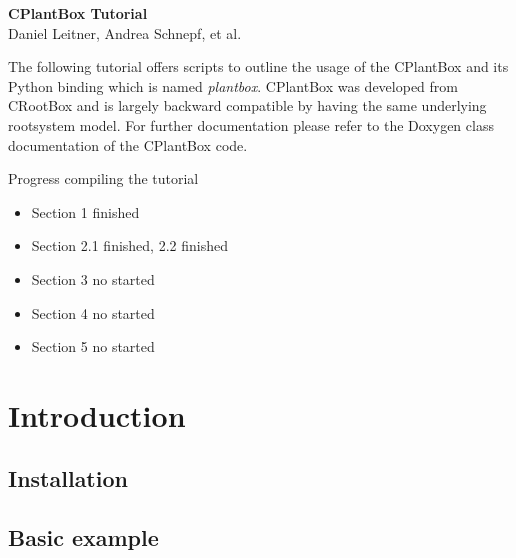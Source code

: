 \documentclass[a4paper]{article}
\begin{document}
\begin{center}
\vspace{0.5 cm}
\huge{\textbf{CPlantBox Tutorial}} \\
\vspace{0.5 cm}
\normalsize
Daniel Leitner, Andrea Schnepf, et al. \\
\end{center}

\vspace{0.5 cm}

\noindent 
The following tutorial offers scripts to outline the usage of the CPlantBox \citep{zhou2020cplantbox} and its Python binding which is named \emph{plantbox}. CPlantBox was developed from CRootBox \citep{schnepf2018crootbox} and is largely backward compatible by having the same underlying rootsystem model. For further documentation please refer to the Doxygen class documentation of the CPlantBox code.
 

\vspace{0.5 cm}

\tableofcontents

\newpage 

Progress compiling the tutorial

\begin{itemize}
 \item Section 1 finished
 \item Section 2.1 finished, 2.2 finished
 \item Section 3 no started
 \item Section 4 no started
 \item Section 5 no started 
\end{itemize}




\newpage
\section{Introduction} \label{sec:introduction}

\subsection{Installation} \label{ssec:installation}


\subsection{Basic example} \label{ssec:basic_example}

\end{document}
